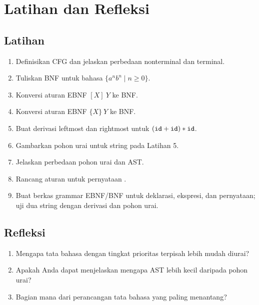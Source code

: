 \section*{Latihan dan Refleksi}

\subsection*{Latihan}
\begin{enumerate}[label=\arabic*.,leftmargin=*]
  \item Definisikan CFG dan jelaskan perbedaan nonterminal dan
        terminal.
  \item Tuliskan BNF untuk bahasa \(\{a^n b^n \mid n \ge 0\}\).
  \item Konversi aturan EBNF \([X]\ Y\) ke BNF.
  \item Konversi aturan EBNF \(\{X\}\ Y\) ke BNF.
  \item Buat derivasi leftmost dan rightmost untuk
        \((\texttt{id} + \texttt{id}) * \texttt{id}\).
  \item Gambarkan pohon urai untuk string pada Latihan 5.
  \item Jelaskan perbedaan pohon urai dan AST.
  \item Rancang aturan untuk pernyataan .
  \item Buat berkas grammar EBNF/BNF untuk deklarasi, ekspresi, dan
        pernyataan; uji dua string dengan derivasi dan pohon urai.
\end{enumerate}

\subsection*{Refleksi}
\begin{reflectionbox}
\begin{enumerate}[label=\arabic*.,leftmargin=*]
  \item Mengapa tata bahasa dengan tingkat prioritas terpisah lebih
        mudah diurai?
  \item Apakah Anda dapat menjelaskan mengapa AST lebih kecil daripada
        pohon urai?
  \item Bagian mana dari perancangan tata bahasa yang paling menantang?
\end{enumerate}
\end{reflectionbox}
